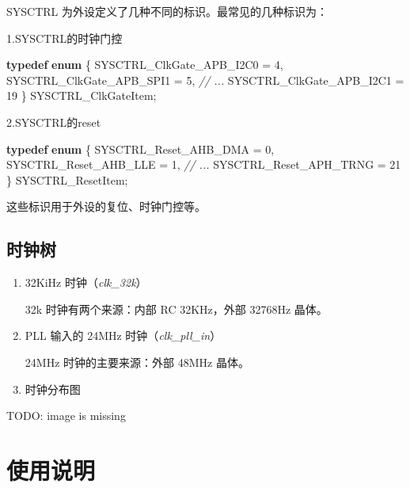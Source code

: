 \documentclass[
  12pt,
]{book}
\newenvironment{Shaded}{\begin{snugshade}}{\end{snugshade}}
\newcommand{\CommentTok}[1]{\textcolor[rgb]{0.56,0.35,0.01}{\textit{#1}}}
\newcommand{\DecValTok}[1]{\textcolor[rgb]{0.00,0.00,0.81}{#1}}
\newcommand{\KeywordTok}[1]{\textcolor[rgb]{0.13,0.29,0.53}{\textbf{#1}}}
\newcommand{\NormalTok}[1]{#1}
\begin{document}
SYSCTRL 为外设定义了几种不同的标识。最常见的几种标识为：

1.SYSCTRL的时钟门控

\begin{Shaded}
\begin{Highlighting}[]
\KeywordTok{typedef} \KeywordTok{enum}
\NormalTok{\{}
\NormalTok{    SYSCTRL_ClkGate_APB_I2C0    = }\DecValTok{4}\NormalTok{,}
\NormalTok{    SYSCTRL_ClkGate_APB_SPI1    = }\DecValTok{5}\NormalTok{,}
    \CommentTok{// ...}
\NormalTok{    SYSCTRL_ClkGate_APB_I2C1    = }\DecValTok{19}
\NormalTok{\} SYSCTRL_ClkGateItem;}
\end{Highlighting}
\end{Shaded}

2.SYSCTRL的reset

\begin{Shaded}
\begin{Highlighting}[]
\KeywordTok{typedef} \KeywordTok{enum}
\NormalTok{\{}
\NormalTok{    SYSCTRL_Reset_AHB_DMA     = }\DecValTok{0}\NormalTok{,}
\NormalTok{    SYSCTRL_Reset_AHB_LLE     = }\DecValTok{1}\NormalTok{,}
    \CommentTok{// ...}
\NormalTok{    SYSCTRL_Reset_APH_TRNG    = }\DecValTok{21}
\NormalTok{\} SYSCTRL_ResetItem;}
\end{Highlighting}
\end{Shaded}

这些标识用于外设的复位、时钟门控等。

\hypertarget{ux65f6ux949fux6811}{%
\subsection{时钟树}\label{ux65f6ux949fux6811}}

\begin{enumerate}
\def\labelenumi{\arabic{enumi}.}
\item
  32KiHz 时钟（\emph{clk\_32k}）

  32k 时钟有两个来源：内部 RC 32KHz，外部 32768Hz 晶体。
\item
  PLL 输入的 24MHz 时钟（\emph{clk\_pll\_in}）

  24MHz 时钟的主要来源：外部 48MHz 晶体。
\item
  时钟分布图
\end{enumerate}

TODO: image is missing

\hypertarget{ux4f7fux7528ux8bf4ux660e-2}{%
\section{使用说明}\label{ux4f7fux7528ux8bf4ux660e-2}}
\end{document}
